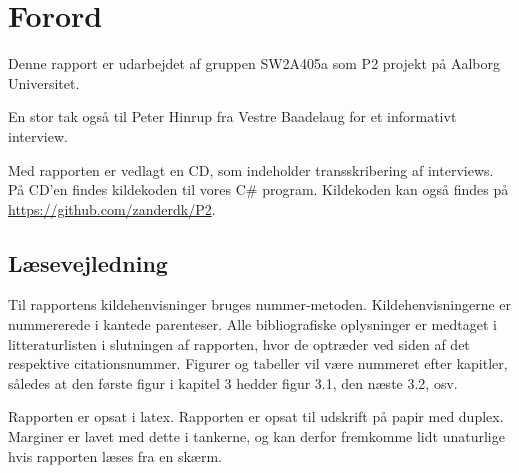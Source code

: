 \chapter*{Forord}
Denne rapport er udarbejdet af gruppen SW2A405a som P2 projekt på Aalborg Universitet.


En stor tak også til Peter Hinrup fra Vestre Baadelaug for et informativt interview.

Med rapporten er vedlagt en CD, som indeholder transskribering af interviews. På CD'en findes kildekoden til vores C\# program. Kildekoden kan også findes på \url{https://github.com/zanderdk/P2}.


\section{Læsevejledning}
Til rapportens kildehenvisninger bruges nummer-metoden. Kildehenvisningerne er nummererede i kantede parenteser. Alle bibliografiske oplysninger er medtaget i litteraturlisten i slutningen af rapporten, hvor de optræder ved siden af det respektive citationsnummer. Figurer og tabeller vil være nummeret efter kapitler, således at den første figur i kapitel 3 hedder figur 3.1, den næste 3.2, osv.	

Rapporten er opsat i latex. Rapporten er opsat til udskrift på papir med duplex. Marginer er lavet med dette i tankerne, og kan derfor fremkomme lidt unaturlige hvis rapporten læses fra en skærm.
